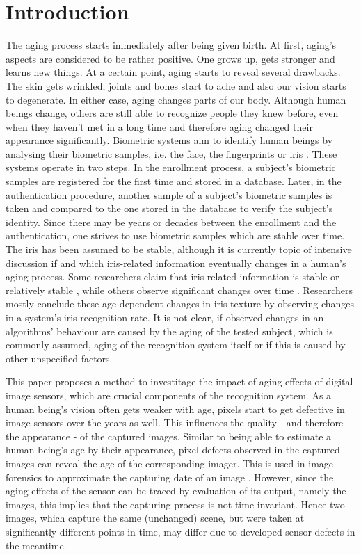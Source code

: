 \documentclass[10pt,twocolumn,letterpaper]{article}
\begin{document}
\section{Introduction}
The aging process starts immediately after being given birth. At first, aging's aspects are considered to be rather positive. One grows up, gets stronger and learns new things. At a certain point, aging starts to reveal several drawbacks. The skin gets wrinkled, joints and bones start to ache and also our vision starts to degenerate. In either case, aging changes parts of our body. Although human beings change, others are still able to recognize people they knew before, even when they haven't met in a long time and therefore aging changed their appearance significantly.
Biometric systems aim to identify human beings by analysing their biometric samples, i.e. the face, the fingerprints or iris \cite{rathgeb}. These systems operate in two steps. In the enrollment process, a subject's biometric samples are registered for the first time and stored in a database. Later, in the authentication procedure, another sample of a subject's biometric samples is taken and compared to the one stored in the database to verify the subject's identity. Since there may be years or decades between the enrollment and the authentication, one strives to use biometric samples which are stable over time. The iris has been assumed to be stable, although it is currently topic of intensive discussion if and which iris-related information eventually changes in a human's aging process. Some researchers claim that iris-related information is stable or relatively stable \cite{daugmanNoChange}, while others observe significant changes over time \cite{rankinChange, rankinChangeResponse, fenkerIrisAging, czajkaTemplateAging, fairhurstNonstability}. Researchers mostly conclude these age-dependent changes in iris texture by observing changes in a system's iris-recognition rate. It is not clear, if observed changes in an algorithms' behaviour are caused by the aging of the tested subject, which is commonly assumed, aging of the recognition system itself or if this is caused by other unspecified factors.

This paper proposes a method to investitage the impact of aging effects of digital image sensors, which are crucial components of the recognition system. As a human being's vision often gets weaker with age, pixels start to get defective in image sensors over the years as well. This influences the quality - and therefore the appearance - of the captured images. Similar to being able to estimate a human being's age by their appearance, pixel defects observed in the captured images can reveal the age of the corresponding imager. This is used in image forensics to approximate the capturing date of an image \cite{fridrich}. However, since the aging effects of the sensor can be traced by evaluation of its output, namely the images, this implies that the capturing process is not time invariant. Hence two images, which capture the same (unchanged) scene, but were taken at significantly different points in time, may differ due to developed sensor defects in the meantime.
\end{document}
